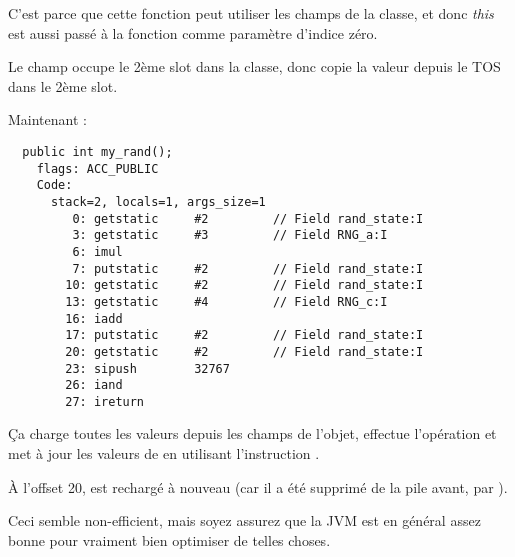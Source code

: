 C'est parce que cette fonction peut utiliser les champs de la classe, et donc \emph{this}
est aussi passé à la fonction comme paramètre d'indice zéro.

Le champ  occupe le 2ème slot dans la classe, donc 
copie la valeur depuis le \ac{TOS} dans le 2ème slot.


Maintenant :

\begin{lstlisting}
  public int my_rand();
    flags: ACC_PUBLIC
    Code:
      stack=2, locals=1, args_size=1
         0: getstatic     #2         // Field rand_state:I
         3: getstatic     #3         // Field RNG_a:I
         6: imul          
         7: putstatic     #2         // Field rand_state:I
        10: getstatic     #2         // Field rand_state:I
        13: getstatic     #4         // Field RNG_c:I
        16: iadd          
        17: putstatic     #2         // Field rand_state:I
        20: getstatic     #2         // Field rand_state:I
        23: sipush        32767
        26: iand          
        27: ireturn       
\end{lstlisting}

Ça charge toutes les valeurs depuis les champs de l'objet, effectue l'opération et
met à jour les valeurs de  en utilisant l'instruction .

À l'offset 20,   est rechargé à nouveau (car il a été supprimé de
la pile avant, par ).

Ceci semble non-efficient, mais soyez assurez que la \ac{JVM} est en général assez
bonne pour vraiment bien optimiser de telles choses.

